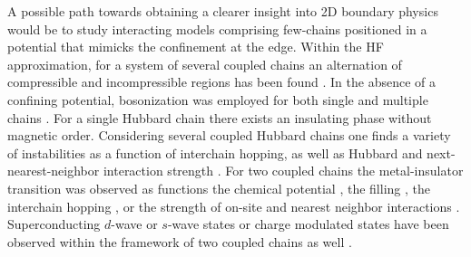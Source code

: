 \documentclass[twocolumn, prl, aps, floatfix, superscriptaddress, longbibliography]{revtex4-1}
\begin{document}
A possible path towards obtaining a clearer insight into 2D boundary physics would be to study interacting models comprising few-chains positioned in a potential that mimicks the confinement at the edge. 
Within the HF approximation, for a system of several coupled chains an alternation of compressible and incompressible regions has been found \cite{Khanna.2021}. In the absence of a confining potential, bosonization was employed for both single and multiple chains \cite{Schulz, Balents1996, Hur2001, GiamarchiBook, FinkelStein1993, Miao2016,Tsuchiizu2001}.
For a single Hubbard chain there exists an insulating phase without magnetic order. Considering several coupled Hubbard chains one finds a variety of instabilities as a function of interchain hopping, as well as Hubbard and next-nearest-neighbor interaction strength \cite{Schulz, Balents1996, Hur2001, GiamarchiBook, FinkelStein1993, Miao2016}. For two coupled chains the metal-insulator transition was observed as functions the chemical potential \cite{Tsuchiizu2001}, the filling \cite{Balents1996}, the interchain hopping \cite{Balents1996, Hur2001, Tsuchiizu2001}, or the strength of on-site and nearest neighbor interactions \cite{Tsuchiizu2001, Hur2001}. Superconducting $d$-wave or $s$-wave states or charge modulated states have been observed within the framework of two coupled chains as well \cite{GiamarchiBook}.
\end{document}
